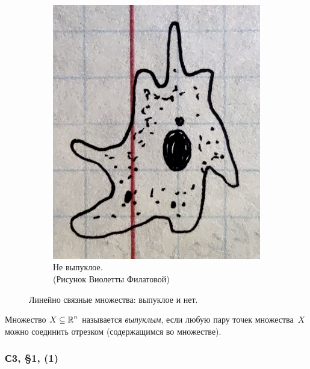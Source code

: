 \documentclass[a4paper,12pt]{article}
\begin{document}
\begin{figure}[ht]
\begin{subfigure}[b]{0.3\textwidth}
      \centering
      \includegraphics[width=\columnwidth]{ameba_c10_lvl200}
  
      \caption{Не выпуклое.\\{\scriptsize (Рисунок Виолетты Филатовой)}}
    \end{subfigure}
    
    \caption{Линейно связные множества: выпуклое и нет.}
    \label{fig:ameba-and-convex}
  \end{figure}

  \begin{definition}
      Множество $X \hm\subseteq \RR^n$ называется \emph{выпуклым},
      если любую пару точек множества~$X$ можно соединить отрезком (содержащимся во множестве).
  \end{definition}
  
  

  \subsubsection{С3, \S 1, (1)}
\end{document}
